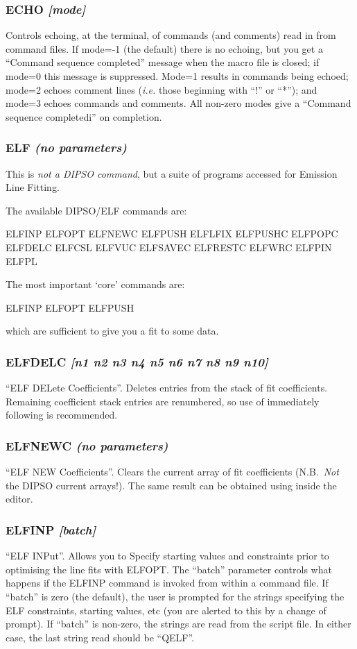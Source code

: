 \documentclass[twoside,11pt,noabs,nolof]{starlink}
\providecommand{\dipcom}[3]{\subsubsection*{\label{COM:#1}\xlabel{COM:#1}\textbf{#1} \emph{#2}}}
\begin{document}
\dipcom{ECHO}{[mode]}{Controls echoing of commands within command files}
Controls echoing, at the terminal, of commands (and comments) read in
from command files. If mode=-1 (the default) there is no echoing, but
you get a ``Command sequence completed'' message when the macro file is
closed; if mode=0 this message is suppressed. Mode=1 results in
commands being echoed; mode=2 echoes comment lines (\emph{i.e.} those
beginning with ``!'' or ``*''); and mode=3 echoes commands and
comments. All non-zero modes give a ``Command sequence completedi''
on completion.

\dipcom{ELF}{(no parameters)}{A suite of programs for Emission Line Fitting}
This is \emph{not a DIPSO command}, but a suite of programs accessed for
Emission Line Fitting.

The available DIPSO/ELF commands are:

\begin{terminalv}
ELFINP   ELFOPT   ELFNEWC
ELFPUSH  ELFLFIX
ELFPUSHC ELFPOPC  ELFDELC ELFCSL ELFVUC
ELFSAVEC ELFRESTC ELFWRC
ELFPIN   ELFPL
\end{terminalv}

The most important `core' commands are:

\begin{terminalv}
ELFINP ELFOPT ELFPUSH
\end{terminalv}

which are sufficient to give you a fit to some data.

\dipcom{ELFDELC}{[n1 n2 n3 n4 n5 n6 n7 n8 n9 n10]}{Deletes entries in the ELF fit co-efficient stack}
``ELF DELete Coefficients''. Deletes entries from the stack of fit
coefficients. Remaining coefficient stack entries are renumbered, so
use of   immediately following   is recommended.

\dipcom{ELFNEWC}{(no parameters)}{Clears the ELF fit co-efficient stack}
``ELF NEW Coefficients''. Clears the current array of fit coefficients
(N.B.\ \emph{Not} the DIPSO current arrays!). The same result can be
obtained using   inside the   editor.

\dipcom{ELFINP}{[batch]}{Sets starting values and constraints for fitting emission lines}

``ELF INPut''. Allows you to Specify starting values and constraints
prior to optimising the line fits with ELFOPT. The ``batch'' parameter
controls what happens if the ELFINP command is invoked from within a
command file. If ``batch'' is zero (the default), the user is prompted for
the strings specifying the ELF constraints, starting values, etc (you are
alerted to this by a change of prompt). If ``batch'' is non-zero, the
strings are read from the script file. In either case, the last string
read should be ``QELF''.
\end{document}

